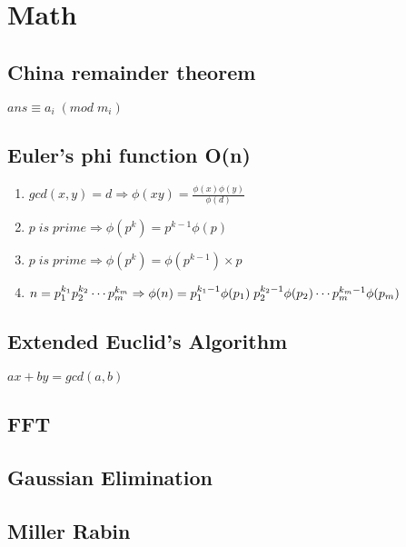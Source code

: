 \documentclass[11pt,twocolumn,a4paper]{article}
\begin{document}

\newpage
\section{Math}
\subsection{China remainder theorem}
$ ans \equiv  a_i\; (mod\; m_i) $


\subsection{Euler's phi function O(n)}
\begin{enumerate}[1.]
\item $gcd(x,y)=d \Rightarrow \phi(xy) = \frac{\phi(x) \phi(y)}{\phi(d)}$
\item $p\; is\; prime \Rightarrow \phi(p^k) = p^{k-1} \phi(p)$
\item $p\; is\; prime \Rightarrow \phi(p^k) = \phi(p^{k-1}) \times p$
\item $n = p_{1}^{k_1} p_{2}^{k_2} \cdots p_{m}^{k_m}\\
\Rightarrow \phi(n) = p_{1}^{k_1-1}\phi(p_1)\; p_{2}^{k_2-1}\phi(p_2) \cdots p_{m}^{k_m-1}\phi(p_m)$
\end{enumerate}


\subsection{Extended Euclid's Algorithm}
$ ax+by=gcd(a,b) $


\subsection{FFT}


\subsection{Gaussian Elimination}


\subsection{Miller Rabin}

\end{document}
